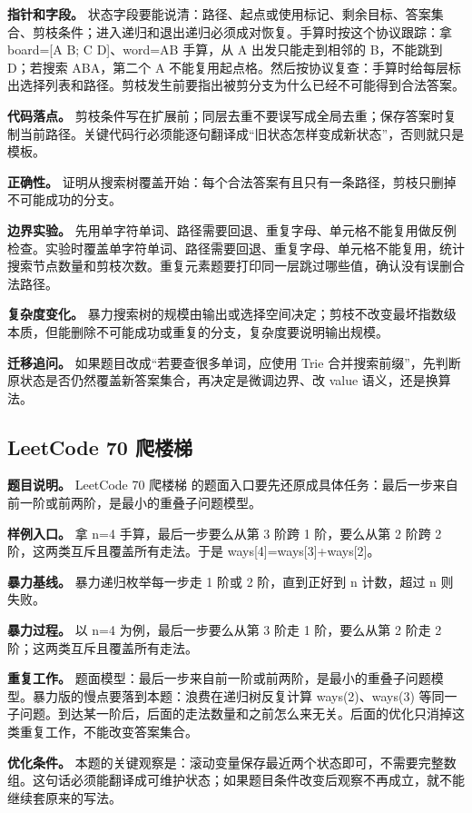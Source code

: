 \textbf{指针和字段。} 状态字段要能说清：路径、起点或使用标记、剩余目标、答案集合、剪枝条件；进入递归和退出递归必须成对恢复。手算时按这个协议跟踪：拿 board=[A B; C D]、word=AB 手算，从 A 出发只能走到相邻的 B，不能跳到 D；若搜索 ABA，第二个 A 不能复用起点格。然后按协议复查：手算时给每层标出选择列表和路径。剪枝发生前要指出被剪分支为什么已经不可能得到合法答案。

\textbf{代码落点。} 剪枝条件写在扩展前；同层去重不要误写成全局去重；保存答案时复制当前路径。关键代码行必须能逐句翻译成“旧状态怎样变成新状态”，否则就只是模板。

\textbf{正确性。} 证明从搜索树覆盖开始：每个合法答案有且只有一条路径，剪枝只删掉不可能成功的分支。

\textbf{边界实验。} 先用单字符单词、路径需要回退、重复字母、单元格不能复用做反例检查。实验时覆盖单字符单词、路径需要回退、重复字母、单元格不能复用，统计搜索节点数量和剪枝次数。重复元素题要打印同一层跳过哪些值，确认没有误删合法路径。

\textbf{复杂度变化。} 暴力搜索树的规模由输出或选择空间决定；剪枝不改变最坏指数级本质，但能删除不可能成功或重复的分支，复杂度要说明输出规模。

\textbf{迁移追问。} 如果题目改成“若要查很多单词，应使用 Trie 合并搜索前缀”，先判断原状态是否仍然覆盖新答案集合，再决定是微调边界、改 value 语义，还是换算法。

\subsection{LeetCode 70 爬楼梯}

\textbf{题目说明。} LeetCode 70 爬楼梯 的题面入口要先还原成具体任务：最后一步来自前一阶或前两阶，是最小的重叠子问题模型。

\textbf{样例入口。} 拿 n=4 手算，最后一步要么从第 3 阶跨 1 阶，要么从第 2 阶跨 2 阶，这两类互斥且覆盖所有走法。于是 ways[4]=ways[3]+ways[2]。

\textbf{暴力基线。} 暴力递归枚举每一步走 1 阶或 2 阶，直到正好到 n 计数，超过 n 则失败。

\textbf{暴力过程。} 以 n=4 为例，最后一步要么从第 3 阶走 1 阶，要么从第 2 阶走 2 阶；这两类互斥且覆盖所有走法。

\textbf{重复工作。} 题面模型：最后一步来自前一阶或前两阶，是最小的重叠子问题模型。暴力版的慢点要落到本题：浪费在递归树反复计算 ways(2)、ways(3) 等同一子问题。到达某一阶后，后面的走法数量和之前怎么来无关。后面的优化只消掉这类重复工作，不能改变答案集合。

\textbf{优化条件。} 本题的关键观察是：滚动变量保存最近两个状态即可，不需要完整数组。这句话必须能翻译成可维护状态；如果题目条件改变后观察不再成立，就不能继续套原来的写法。

